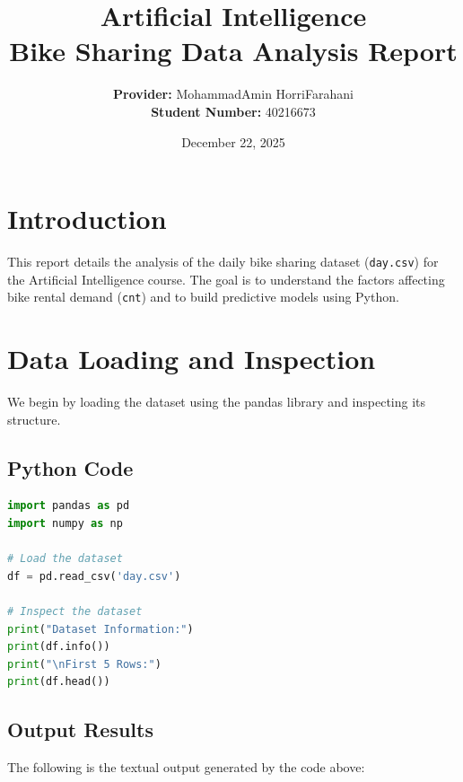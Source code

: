 \documentclass[12pt, a4paper]{article}
\title{\textbf{Artificial Intelligence } \\ \large Bike Sharing Data Analysis Report}
\author{\textbf{Provider:} MohammadAmin HorriFarahani \\ \textbf{Student Number:} 40216673}
\date{December 22, 2025}
\begin{document}
\maketitle

\tableofcontents
\newpage

\section{Introduction}
This report details the analysis of the daily bike sharing dataset (\texttt{day.csv}) for the Artificial Intelligence course. The goal is to understand the factors affecting bike rental demand (\texttt{cnt}) and to build predictive models using Python.

\section{Data Loading and Inspection}
We begin by loading the dataset using the pandas library and inspecting its structure.

\subsection{Python Code}
\begin{lstlisting}[language=Python, caption=Data Loading and Inspection]
import pandas as pd
import numpy as np

# Load the dataset
df = pd.read_csv('day.csv')

# Inspect the dataset
print("Dataset Information:")
print(df.info())
print("\nFirst 5 Rows:")
print(df.head())
\end{lstlisting}

\subsection{Output Results}
The following is the textual output generated by the code above:
\end{document}
